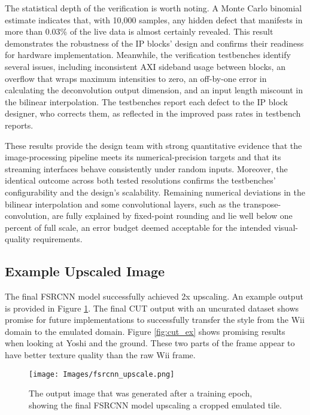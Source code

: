 \documentclass{article}
\begin{document}
    \par The statistical depth of the verification is worth noting. A Monte Carlo binomial estimate indicates that, with 10,000 samples, any hidden defect that manifests in more than 0.03\% of the live data is almost certainly revealed. This result demonstrates the robustness of the IP blocks' design and confirms their readiness for hardware implementation. Meanwhile, the verification testbenches identify several issues, including inconsistent AXI sideband usage between blocks, an overflow that wraps maximum intensities to zero, an off-by-one error in calculating the deconvolution output dimension, and an input length miscount in the bilinear interpolation. The testbenches report each defect to the IP block designer, who corrects them, as reflected in the improved pass rates in testbench reports.

    \par These results provide the design team with strong quantitative evidence that the image-processing pipeline meets its numerical-precision targets and that its streaming interfaces behave consistently under random inputs. Moreover, the identical outcome across both tested resolutions confirms the testbenches' configurability and the design’s scalability. Remaining numerical deviations in the bilinear interpolation and some convolutional layers, such as the transpose-convolution, are fully explained by fixed-point rounding and lie well below one percent of full scale, an error budget deemed acceptable for the intended visual-quality requirements.
    
    \subsection{Example Upscaled Image}
    \noindent The final FSRCNN model successfully achieved 2x upscaling. An example output is provided in Figure \ref{fig:fsrcnn_upscale}. The final CUT output with an uncurated dataset shows promise for future implementations to successfully transfer the style from the Wii domain to the emulated domain. Figure \ref{fig:cut_ex} shows promising results when looking at Yoshi and the ground. These two parts of the frame appear to have better texture quality than the raw Wii frame.

        \begin{figure}[!tb] 
            \centering
            \texttt{[image: Images/fsrcnn\_upscale.png]} 
            \caption{The output image that was generated after a training epoch, showing the final FSRCNN model upscaling a cropped emulated tile.} 
            \label{fig:fsrcnn_upscale} 
        \end{figure}
\end{document}
